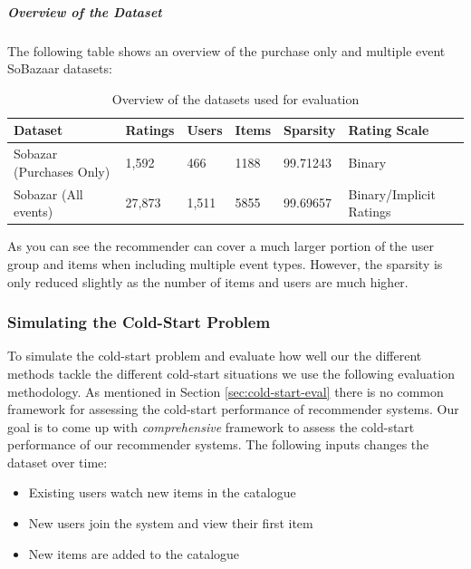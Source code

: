 \subparagraph{Overview of the Dataset}

The following table shows an overview of the purchase only and multiple event SoBazaar datasets:


\begin{table}[H]
    \centering
    \begin{tabular}{l l l l l l }
    \toprule
	Dataset						& 	Ratings		& 	Users		& 	Items 		& 	Sparsity			& Rating Scale 				    \\ \midrule
	Sobazar	(Purchases Only) 	&	1,592		&	466			&	1188		&	99.71243			& Binary						\\
	Sobazar (All events)		& 	27,873  	& 	1,511		&	5855		& 	99.69657			& Binary/Implicit Ratings		\\
	\bottomrule
    \end{tabular}
    \caption [Overview of the datasets used for evaluation]{Overview of the datasets used for evaluation}
    \label{table:datasets}
\end{table}

As you can see the recommender can cover a much larger portion of the user group and items when including multiple event types. However,
the sparsity is only reduced slightly as the number of items and users are much higher.

\subsubsection{Simulating the Cold-Start Problem}

To simulate the cold-start problem and evaluate how well our the different
methods tackle the different cold-start situations we use the following
evaluation methodology. As mentioned in Section \ref{sec:cold-start-eval} there
is no common framework for assessing the cold-start performance of recommender
systems.  Our goal is to come up with \emph{comprehensive} framework to assess
the cold-start performance of our recommender systems. The following inputs
changes the dataset over time:

\begin{itemize}
	\item 	Existing users watch new items in the catalogue
	\item	New users join the system and view their first item
	\item	New items are added to the catalogue
\end{itemize}

